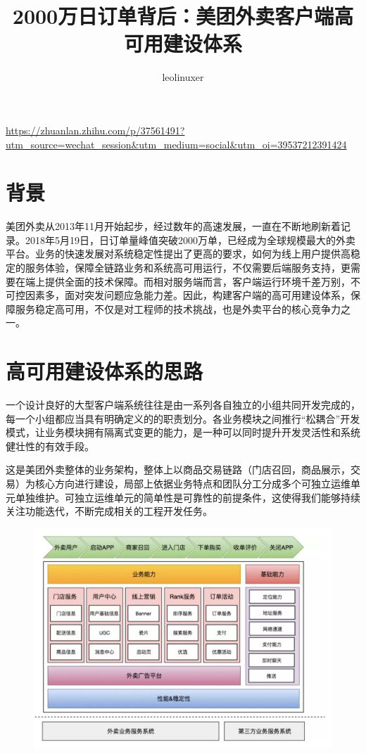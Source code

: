 \documentclass[12pt]{article}
\title{2000万日订单背后：美团外卖客户端高可用建设体系}
\author{leolinuxer}
\begin{document}
\maketitle
\tableofcontents

\url{https://zhuanlan.zhihu.com/p/37561491?utm_source=wechat_session&utm_medium=social&utm_oi=39537212391424}
\section{背景}
美团外卖从2013年11月开始起步，经过数年的高速发展，一直在不断地刷新着记录。2018年5月19日，日订单量峰值突破2000万单，已经成为全球规模最大的外卖平台。业务的快速发展对系统稳定性提出了更高的要求，如何为线上用户提供高稳定的服务体验，保障全链路业务和系统高可用运行，不仅需要后端服务支持，更需要在端上提供全面的技术保障。而相对服务端而言，客户端运行环境千差万别，不可控因素多，面对突发问题应急能力差。因此，构建客户端的高可用建设体系，保障服务稳定高可用，不仅是对工程师的技术挑战，也是外卖平台的核心竞争力之一。

\section{高可用建设体系的思路}
一个设计良好的大型客户端系统往往是由一系列各自独立的小组共同开发完成的，每一个小组都应当具有明确定义的的职责划分。各业务模块之间推行“松耦合”开发模式，让业务模块拥有隔离式变更的能力，是一种可以同时提升开发灵活性和系统健壮性的有效手段。

这是美团外卖整体的业务架构，整体上以商品交易链路（门店召回，商品展示，交易）为核心方向进行建设，局部上依据业务特点和团队分工分成多个可独立运维单元单独维护。可独立运维单元的简单性是可靠性的前提条件，这使得我们能够持续关注功能迭代，不断完成相关的工程开发任务。

\begin{figure}[H]
    \centering
    \includegraphics[width=1\textwidth]{fig/Meituan_APP_High_1.png}
\end{figure}
\end{document}
